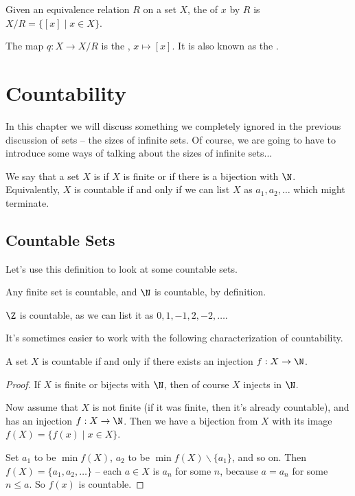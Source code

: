 \documentclass[a4paper]{scrreprt}
\begin{document}
\begin{definition}
	Given an equivalence relation $R$ on a set $X$, the  of $x$ by $R$ is $X/R = \{[x] \mid x \in X\}$.

	The map $q : X \rightarrow X/R$ is the , $x \mapsto [x]$. It is also known as the .
\end{definition}

\chapter{Countability}

In this chapter we will discuss something we completely ignored in the previous discussion of sets -- the sizes of infinite sets. Of course, we are going to have to introduce some ways of talking about the sizes of infinite sets...

\begin{definition}[Countability]
	We say that a set $X$ is  if $X$ is finite or if there is a bijection with $\N$. Equivalently, $X$ is countable if and only if we can list $X$ as $a_1, a_2, \dots$ which might terminate.
\end{definition}

\section{Countable Sets}

Let's use this definition to look at some countable sets.

\begin{example}
	Any finite set is countable, and $\N$ is countable, by definition.
\end{example}

\begin{example}[$\Z$ is Countable]
	$\Z$ is countable, as we can list it as $0, 1, -1, 2, -2, \dots$.
\end{example}

It's sometimes easier to work with the following characterization of countability.

\begin{proposition}
	A set $X$ is countable if and only if there exists an injection $f : X \rightarrow \N$.
\end{proposition}
\begin{proof}
If $X$ is finite or bijects with $\N$, then of course $X$ injects in $\N$.

Now assume that $X$ is not finite (if it was finite, then it's already countable), and has an injection $f : X \rightarrow \N$. Then we have a bijection from $X$ with its image $f(X) = \{f(x) \mid x \in X \}$. 

Set $a_1$ to be $\min f(X)$, $a_2$ to be $\min f(X) \backslash \{a_1\}$, and so on. Then $f(X) = \{a_1, a_2, \dots \}$ -- each $a \in X$ is $a_n$ for some $n$, because $a = a_n$ for some $n \leq a$.
So $f(x)$ is countable.
\end{proof}
\end{document}
